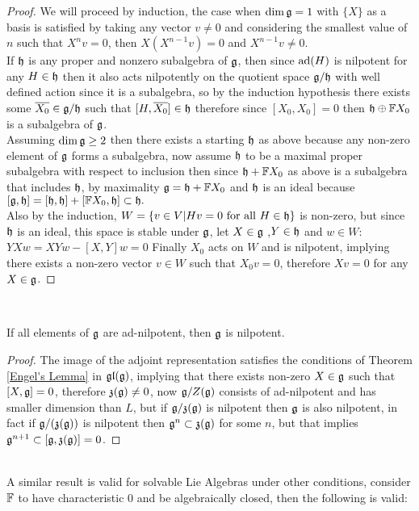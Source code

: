 \begin{proof}
	We will proceed by induction, the case when $\dim \mathfrak{g} = 1$ with $\{X\}$ as a basis is satisfied by taking any vector $v\not=0$ and considering the smallest value of $n$ such that $X^nv=0$, then $X(X^{n-1}v) = 0$ and $X^{n-1}v \not= 0$.\\
	If $\mathfrak{h}$ is any proper and nonzero subalgebra of $\mathfrak{g}$, then since $\text{ad}(H)$ is nilpotent for any $H \in \mathfrak{h}$ then it also acts nilpotently on the quotient space $\mathfrak{g}/\mathfrak{h}$ with well defined action since it is a subalgebra, so by the induction hypothesis there exists some $\overline{X_0} \in \mathfrak{g}/\mathfrak{h}$ such that $[H,\overline{X_0}] \in \mathfrak{h}$ therefore since $[X_0,X_0]=0$ then $\mathfrak{h} \oplus \mathbb{F} X_0$ is a subalgebra of $\mathfrak{g}$.\\
	Assuming $\dim \mathfrak{g}\ge2$ then there exists a starting $\mathfrak{h}$ as above because any non-zero element of $\mathfrak{g}$ forms a subalgebra, now assume  $\mathfrak{h}$ to be a maximal proper subalgebra with respect to inclusion then since $\mathfrak{h} + \mathbb{F} X_0$ as above is a subalgebra that includes $\mathfrak{h}$, by maximality $\mathfrak{g} = \mathfrak{h} + \mathbb{F} X_0$ and $\mathfrak{h}$ is an ideal because $[\mathfrak{g},\mathfrak{h}] = [\mathfrak{h},\mathfrak{h}]+ [\mathbb{F} X_0,\mathfrak{h}] \subset \mathfrak{h}.$\\
	Also by the induction, $W=\{v \in V|Hv = 0 \text{ for all } H \in \mathfrak{h}\}$ is non-zero, but since $\mathfrak{h}$ is an ideal, this space is stable under $\mathfrak{g}$, let $X \in \mathfrak{g}$ ,$Y \in \mathfrak{h}$ and $w \in W$:
	$YXw = XYw - [X,Y]w = 0$
	Finally $X_0$ acts on $W$ and is nilpotent, implying there exists a non-zero vector $v \in W$ such that $X_0v=0$, therefore $X v = 0$ for any $X \in \mathfrak{g}$.
\end{proof}\\
\begin{teo}
If all elements of $\mathfrak{g}$ are ad-nilpotent, then $\mathfrak{g}$ is nilpotent.
\label{Engel's Theorem}
\end{teo}
\begin{proof}
The image of the adjoint representation satisfies the conditions of Theorem \ref{Engel's Lemma} in $\mathfrak{gl}(\mathfrak{g})$, implying that there exists non-zero $X \in \mathfrak{g}$ such that $[X,\mathfrak{g}]=0$, therefore $\mathfrak{z}(\mathfrak{g})\not=0$, now $\mathfrak{g}/Z(\mathfrak{g})$ consists of ad-nilpotent and has smaller dimension than $L$, but if $\mathfrak{g}/\mathfrak{z}(\mathfrak{g})$ is nilpotent then $\mathfrak{g}$ is also nilpotent, in fact if $\mathfrak{g}/(\mathfrak{z}(\mathfrak{g}))$ is nilpotent then $\mathfrak{g}^n \subset \mathfrak{z}(\mathfrak{g})$ for some $n$, but that implies $\mathfrak{g}^{n+1} \subset [\mathfrak{g},\mathfrak{z}(\mathfrak{g})] = 0$.
\end{proof}\\
A similar result is valid for solvable Lie Algebras under other conditions, consider $\mathbb{F}$ to have characteristic $0$ and be algebraically closed, then the following is valid:
